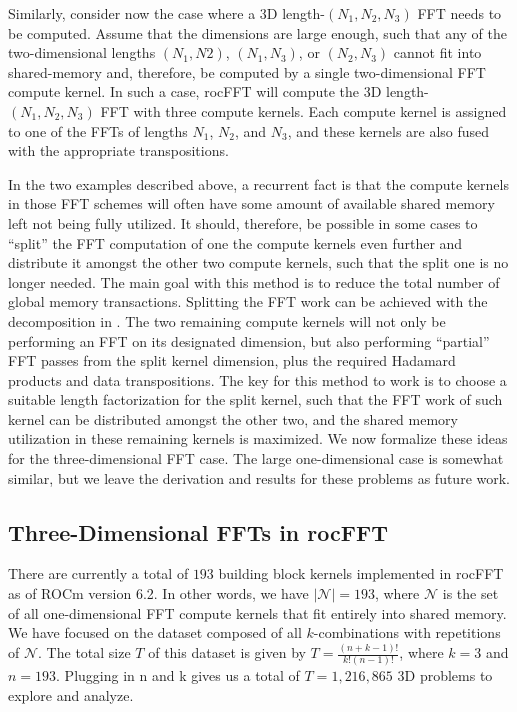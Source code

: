 \documentclass{gtac}
\theoremstyle{problemstyle}
\begin{document}
Similarly, consider now the case where a 3D length-$(N_1,N_2,N_3)$ FFT needs to be computed. Assume that the dimensions are large enough, such that any of the two-dimensional lengths $(N_1,N2)$, $(N_1,N_3)$, or $(N_2,N_3)$ cannot fit into shared-memory and, therefore, be computed by a single two-dimensional FFT compute kernel. In such a case, rocFFT will compute the 3D length-$(N_1,N_2,N_3)$ FFT with three compute kernels. Each compute kernel is assigned to one of the FFTs of lengths $N_1$, $N_2$, and $N_3$, and these kernels are also fused with the appropriate transpositions.

In the two examples described above, a recurrent fact is that the compute kernels in those FFT schemes will often have some amount of available shared memory left not being fully utilized. It should, therefore, be possible in some cases to ``split'' the FFT computation of one the compute kernels even further and distribute it amongst the other two compute kernels, such that the split one is no longer needed. The main goal with this method is to reduce the total number of global memory transactions. Splitting the FFT work can be achieved with the decomposition in . The two remaining compute kernels will not only be performing an FFT on its designated dimension, but also performing ``partial'' FFT passes from the split kernel dimension, plus the required Hadamard products and data transpositions. The key for this method to work is to choose a suitable length factorization for the split kernel, such that the FFT work of such kernel can be distributed amongst the other two, and the shared memory utilization in these remaining kernels is maximized. We now formalize these ideas for the three-dimensional FFT case. The large one-dimensional case is somewhat similar, but we leave the derivation and results for these problems as future work.

\subsection{Three-Dimensional FFTs in rocFFT}

There are currently a total of $193$ building block kernels implemented in rocFFT as of ROCm version 6.2. In other words, we have $\left| \mathcal{N} \right| = 193$, where $\mathcal{N}$ is the set of all one-dimensional FFT compute kernels that fit entirely into shared memory. We have focused on the dataset composed of all $k$-combinations with repetitions of $\mathcal{N}$. The total size $T$ of this dataset is given by $T = \frac{(n+k-1)!}{k!(n-1)!}$, where $k=3$ and $n=193$. Plugging in n and k gives us a total of $T=1,216,865$ 3D problems to explore and analyze. 
\end{document}
